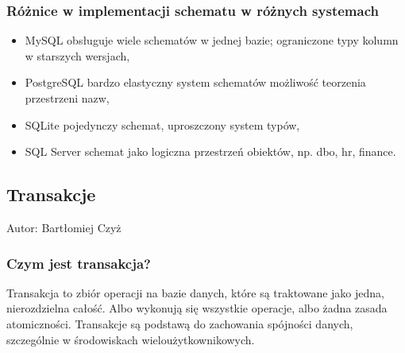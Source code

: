\documentclass[letterpaper,10pt,polish]{sphinxmanual}
\begin{document}
\subsubsection{Różnice w implementacji schematu w różnych systemach}
\label{\detokenize{rozdzial2/Kontrola_i_konserwacja/kontrola_i_konserwacja:roznice-w-implementacji-schematu-w-roznych-systemach}}\begin{itemize}
\item {} 
\sphinxAtStartPar
MySQL \sphinxhyphen{} obsługuje wiele schematów w jednej bazie; ograniczone typy kolumn w starszych wersjach,

\item {} 
\sphinxAtStartPar
PostgreSQL \sphinxhyphen{} bardzo elastyczny system schematów \sphinxhyphen{} możliwość teorzenia przestrzeni nazw,

\item {} 
\sphinxAtStartPar
SQLite \sphinxhyphen{} pojedynczy schemat, uproszczony system typów,

\item {} 
\sphinxAtStartPar
SQL Server \sphinxhyphen{} schemat jako logiczna przestrzeń obiektów, np. dbo, hr, finance.

\end{itemize}


\subsection{Transakcje}
\label{\detokenize{rozdzial2/Kontrola_i_konserwacja/kontrola_i_konserwacja:transakcje}}
\sphinxAtStartPar
Autor: Bartłomiej Czyż


\subsubsection{Czym jest transakcja?}
\label{\detokenize{rozdzial2/Kontrola_i_konserwacja/kontrola_i_konserwacja:czym-jest-transakcja}}
\sphinxAtStartPar
Transakcja to zbiór operacji na bazie danych, które są traktowane jako jedna, nierozdzielna całość. Albo wykonują się wszystkie operacje, albo żadna \sphinxhyphen{} zasada atomiczności. Transakcje są podstawą do zachowania spójności danych, szczególnie w środowiskach wieloużytkownikowych.
\end{document}
